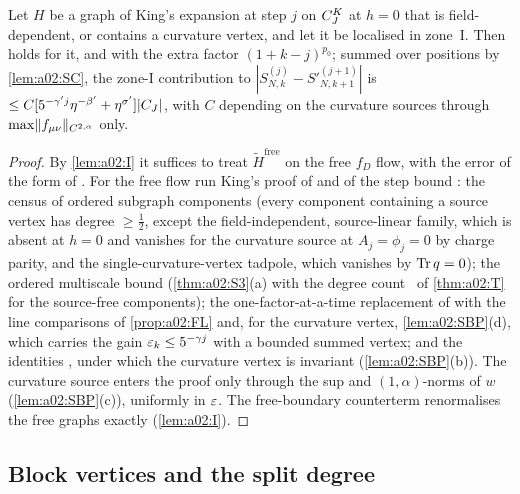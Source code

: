 \begin{theorem}\label{thm:a02:B4}\label{thm:a02:B5}
Let $H$ be a graph of King's expansion at step $j$ on $C^{K}_{J}$ at $h=0$ that is field-dependent, or contains a curvature vertex, and let it be localised in zone~I. Then \cite[(3.39)]{K1} holds for it, and \cite[(3.38)]{K1} with the extra factor $(1+k-j)^{p_0}$; summed over positions by \cref{lem:a02:SC}, the zone-I contribution to $|S^{(j)}_{N,k}-S'^{(j+1)}_{N,k+1}|$ is $\le C[5^{-\gamma'j}\eta^{-\beta'}+\eta^{\sigma'}]|C_J|$, with $C$ depending on the curvature sources through $\max\lVert f_{\mu\nu}\rVert_{C^{2,\alpha}}$ only.
\end{theorem}
\begin{proof}
By \cref{lem:a02:I} it suffices to treat $\tilde H^{\mathrm{free}}$ on the free $f_D$ flow, with the error of the form of \cite[(3.39)]{K1}. For the free flow run King's proof of \cite[Thm.~3.5]{K1} and of the step bound \cite[Prop.~3.6]{K1}: the census of ordered subgraph components (every component containing a source vertex has degree $\ge\frac12$, except the field-independent, source-linear family, which is absent at $h=0$ and vanishes for the curvature source at $A_j=\phi_j=0$ by charge parity, and the single-curvature-vertex tadpole, which vanishes by $\operatorname{Tr} q=0$); the ordered multiscale bound (\cref{thm:a02:S3}(a) with the degree count \DEG\ of \cref{thm:a02:T} for the source-free components); the one-factor-at-a-time replacement of \cite[pp.~663--665]{K1} with the line comparisons of \cref{prop:a02:FL} and, for the curvature vertex, \cref{lem:a02:SBP}(d), which carries the gain $\varepsilon_k\le5^{-\gamma j}$ with a bounded summed vertex; and the identities \cite[(3.43)--(3.55)]{K1}, under which the curvature vertex is invariant (\cref{lem:a02:SBP}(b)). The curvature source enters the proof only through the sup and $(1,\alpha)$-norms of $w$ (\cref{lem:a02:SBP}(c)), uniformly in $\varepsilon$. The free-boundary counterterm renormalises the free graphs exactly (\cref{lem:a02:I}).
\end{proof}

\subsection{Block vertices and the split degree}\label{ssec:a02:blocks}

